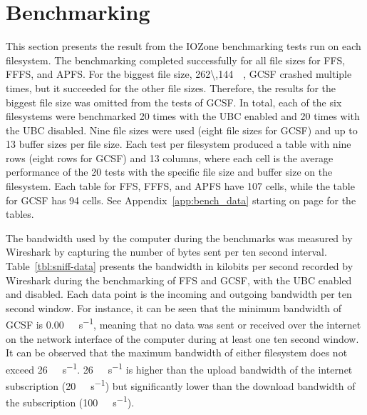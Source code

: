 \section{Benchmarking}
\label{sec:res_bench}
This section presents the result from the IOZone benchmarking tests run on each filesystem. The benchmarking completed successfully for all file sizes for \gls{FFS}, \gls{FFFS}, and \gls{APFS}. For the biggest file size, \SI{262\,144}{\kilo\byte}, \gls{GCSF} crashed multiple times, but it succeeded for the other file sizes. Therefore, the results for the biggest file size was omitted from the tests of \gls{GCSF}. In total, each of the six filesystems were benchmarked 20 times with the \gls{UBC} enabled and 20 times with the \gls{UBC} disabled. Nine file sizes were used (eight file sizes for \gls{GCSF}) and up to 13 buffer sizes per file size. Each test per filesystem produced a table with nine rows (eight rows for \gls{GCSF}) and 13 columns, where each cell is the average performance of the 20 tests with the specific file size and buffer size on the filesystem. Each table for \gls{FFS}, \gls{FFFS}, and \gls{APFS} have 107 cells, while the table for \gls{GCSF} has 94 cells. See Appendix~\ref{app:bench_data} starting on page \pageref{app:bench_data} for the tables.

The bandwidth used by the computer during the benchmarks was measured by Wireshark by capturing the number of bytes sent per ten second interval. Table~\ref{tbl:sniff-data} presents the bandwidth in kilobits per second recorded by Wireshark during the benchmarking of \gls{FFS} and \gls{GCSF}, with the \gls{UBC} enabled and disabled. Each data point is the incoming and outgoing bandwidth per ten second window. For instance, it can be seen that the minimum bandwidth of \gls{GCSF} is \SI[per-mode = symbol]{0.00}{\kilo\byte\per\second}, meaning that no data was sent or received over the internet on the network interface of the computer during at least one ten second window. It can be observed that the maximum bandwidth of either filesystem does not exceed \SI[per-mode = symbol]{26}{\mega\bit\per\second}. \SI[per-mode = symbol]{26}{\mega\bit\per\second} is higher than the upload bandwidth of the internet subscription (\SI[per-mode = symbol]{20}{\mega\bit\per\second}) but significantly lower than the download bandwidth of the subscription (\SI[per-mode = symbol]{100}{\mega\bit\per\second}).




